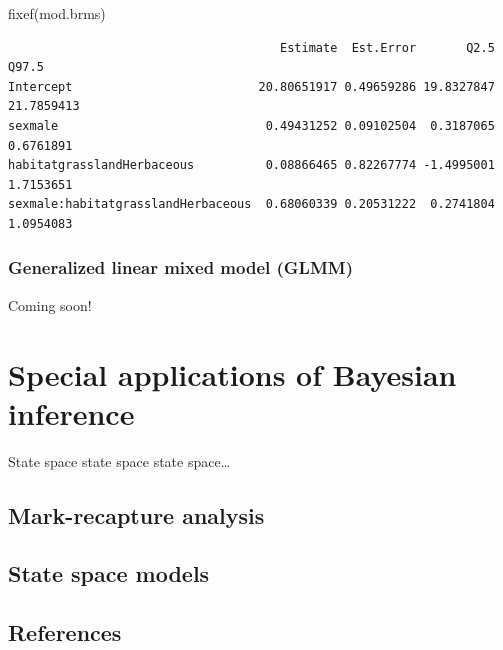 \documentclass[
  13,
  letterpaper,
]{report}
\newenvironment{Shaded}{\begin{snugshade}}{\end{snugshade}}
\newcommand{\FunctionTok}[1]{\textcolor[rgb]{0.28,0.35,0.67}{#1}}
\newcommand{\NormalTok}[1]{\textcolor[rgb]{0.00,0.23,0.31}{#1}}
\begin{document}
\begin{Shaded}
\begin{Highlighting}[]
\FunctionTok{fixef}\NormalTok{(mod.brms)}
\end{Highlighting}
\end{Shaded}

\begin{verbatim}
                                      Estimate  Est.Error       Q2.5      Q97.5
Intercept                          20.80651917 0.49659286 19.8327847 21.7859413
sexmale                             0.49431252 0.09102504  0.3187065  0.6761891
habitatgrasslandHerbaceous          0.08866465 0.82267774 -1.4995001  1.7153651
sexmale:habitatgrasslandHerbaceous  0.68060339 0.20531222  0.2741804  1.0954083
\end{verbatim}

\section{Generalized linear mixed model (GLMM)}\label{sec-mixed-glmm}

Coming soon!

\part{Special applications of Bayesian inference}

State space state space state space\ldots{}

\chapter{Mark-recapture analysis}\label{sec-mark}

\chapter{State space models}\label{sec-state}


\chapter*{References}\label{references}

\end{document}

